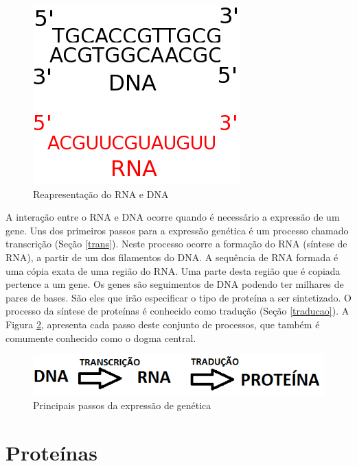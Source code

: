 \begin{figure}[htb!]
    \centering
    \includegraphics[scale=0.7]{./figuras/repre_sequencia.png}
    \caption{Reapresentação do RNA e DNA}
    \label{fig:repre_sequencia}
\end{figure}

A interação entre o RNA e DNA ocorre quando é necessário a expressão de um gene. Uns dos primeiros passos para a expressão genética é um processo chamado transcrição (Seção \ref{trans}). Neste processo ocorre a formação do RNA (síntese de RNA), a partir de um dos filamentos do DNA. A sequência de RNA formada é uma cópia exata de uma região do RNA. Uma parte desta região que é copiada pertence a um gene. Os genes são seguimentos de DNA podendo ter milhares de pares de bases. São eles que irão especificar o tipo de proteína a ser sintetizado. O processo da síntese de proteínas é conhecido como tradução (Seção \ref{traducao}). A Figura \ref{fig:passo_expresscao_genica}, apresenta cada passo deste conjunto de processos, que também é comumente conhecido como o dogma central.

\begin{figure}[htb!]
    \centering
    \includegraphics[scale=0.7]{./figuras/passo_expresscao_genica.png}
    \caption{Principais passos da expressão de genética}
    \label{fig:passo_expresscao_genica}
\end{figure}

\section{Proteínas}

